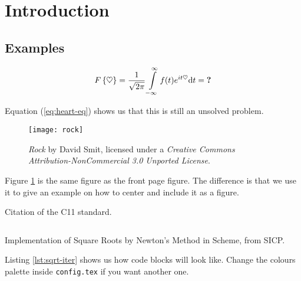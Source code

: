 
\section{Introduction}\label{sec:intro}

\subsection{Examples}

\lipsum[1-2]

\begin{equation} \label{eq:heart-eq}
  F\left\{ \heartsuit \right \} =
  \frac{1}{\sqrt{2\pi}} \int\limits_{-\infty}^{\infty} f(t) e^{i t \heartsuit} \mathrm{d} t
  = \text{\textbf{?}}
\end{equation}

Equation (\ref{eq:heart-eq}) shows us that this is still an unsolved problem.

\lipsum[3]

\begin{figure}
  \centering
  \texttt{[image: rock]}
  \caption[Rock]{\emph{Rock} by David Smit, licensed under a \emph{Creative
      Commons Attribution-NonCommercial 3.0 Unported License}.}
  \label{fig:rock}
\end{figure}

Figure \ref{fig:rock} is the same figure as the front page figure. The
difference is that we use it to give an example on how to center and include it
as a figure.

\lipsum[4]

Citation of the C11 standard\cite{iso2011c}.

\lipsum[11-12]

\begin{listing}
  \inputminted[frame=single,linenos,fontsize=\small,mathescape]{scm}{lst/sqrt-iter.scm}
  \caption[Square Roots in Scheme]{Implementation of Square Roots by Newton's
    Method in Scheme, from SICP.}
  \label{lst:sqrt-iter}
\end{listing}

Listing \ref{lst:sqrt-iter} shows us how code blocks will look like. Change the
colours palette inside \texttt{config.tex} if you want another one.

\lipsum[13]
